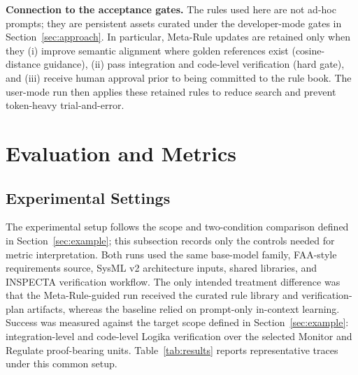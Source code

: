 \documentclass[conference]{IEEEtran}
\begin{document}
\textbf{Connection to the acceptance gates.} The rules used here are not ad-hoc prompts; they are persistent assets curated under the developer-mode gates in Section~\ref{sec:approach}. In particular, Meta-Rule updates are retained only when they (i) improve semantic alignment where golden references exist (cosine-distance guidance), (ii) pass integration and code-level verification (hard gate), and (iii) receive human approval prior to being committed to the rule book. The user-mode run then applies these retained rules to reduce search and prevent token-heavy trial-and-error.


\section{Evaluation and Metrics}
\label{sec:evaluation}

\subsection{Experimental Settings}
The experimental setup follows the scope and two-condition comparison defined in Section~\ref{sec:example}; this subsection records only the controls needed for metric interpretation. Both runs used the same base-model family, FAA-style requirements source, SysML v2 architecture inputs, shared libraries, and INSPECTA verification workflow. The only intended treatment difference was that the Meta-Rule-guided run received the curated rule library and verification-plan artifacts, whereas the baseline relied on prompt-only in-context learning. Success was measured against the target scope defined in Section~\ref{sec:example}: integration-level and code-level Logika verification over the selected Monitor and Regulate proof-bearing units. Table~\ref{tab:results} reports representative traces under this common setup.
\end{document}
